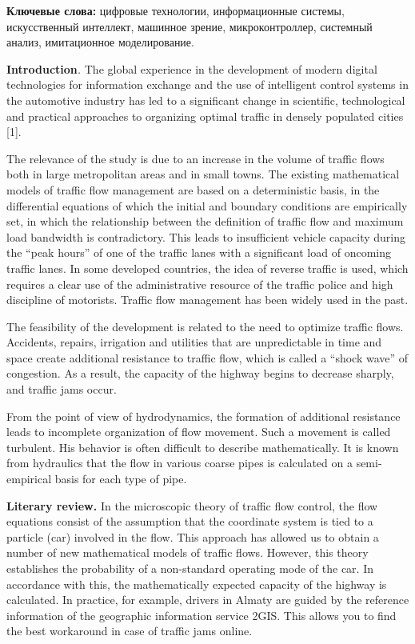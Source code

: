 \textbf{Ключевые слова:} цифровые технологии, информационные системы,
искусственный интеллект, машинное зрение, микроконтроллер, системный
анализ, имитационное моделирование.

\textbf{Introduction}\emph{.} The global experience in the development
of modern digital technologies for information exchange and the use of
intelligent control systems in the automotive industry has led to a
significant change in scientific, technological and practical approaches
to organizing optimal traffic in densely populated cities {[}1{]}.

The relevance of the study is due to an increase in the volume of
traffic flows both in large metropolitan areas and in small towns. The
existing mathematical models of traffic flow management are based on a
deterministic basis, in the differential equations of which the initial
and boundary conditions are empirically set, in which the relationship
between the definition of traffic flow and maximum load bandwidth is
contradictory. This leads to insufficient vehicle capacity during the
``peak hours'' of one of the traffic lanes with a significant load of
oncoming traffic lanes. In some developed countries, the idea of reverse
traffic is used, which requires a clear use of the administrative
resource of the traffic police and high discipline of motorists. Traffic
flow management has been widely used in the past.

The feasibility of the development is related to the need to optimize
traffic flows. Accidents, repairs, irrigation and utilities that are
unpredictable in time and space create additional resistance to traffic
flow, which is called a ``shock wave'' of congestion. As a result, the
capacity of the highway begins to decrease sharply, and traffic jams
occur.

From the point of view of hydrodynamics, the formation of additional
resistance leads to incomplete organization of flow movement. Such a
movement is called turbulent. His behavior is often difficult to
describe mathematically. It is known from hydraulics that the flow in
various coarse pipes is calculated on a semi-empirical basis for each
type of pipe.

\textbf{Literary review.} In the microscopic theory of traffic flow
control, the flow equations consist of the assumption that the
coordinate system is tied to a particle (car) involved in the flow. This
approach has allowed us to obtain a number of new mathematical models of
traffic flows. However, this theory establishes the probability of a
non-standard operating mode of the car. In accordance with this, the
mathematically expected capacity of the highway is calculated. In
practice, for example, drivers in Almaty are guided by the reference
information of the geographic information service 2GIS. This allows you
to find the best workaround in case of traffic jams online.

